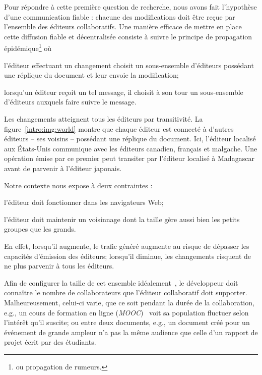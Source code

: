 Pour répondre à cette première question de recherche, nous avons fait
l'hypothèse d'une communication fiable : chacune des modifications doit être
reçue par l'ensemble des éditeurs collaboratifs.
Une manière efficace de mettre en place cette diffusion fiable et décentralisée
consiste à suivre le principe de propagation épidémique\footnote{ou propagation
  de rumeurs.}  où
\begin{inparaenum}[(i)]
\item l'éditeur effectuant un changement choisit un sous-ensemble d'éditeurs
  possédant une réplique du document et leur envoie la modification;
\item lorsqu'un éditeur reçoit un tel message, il choisit à son tour un
  sous-ensemble d'éditeurs auxquels faire suivre le message.
\end{inparaenum}
Les changements atteignent tous les éditeurs par transitivité.
La figure~\ref{intro:img:world} montre que chaque éditeur est connecté à
d'autres éditeurs -- ses voisins -- possédant une réplique du document. Ici,
l'éditeur localisé aux États-Unis communique avec les éditeurs canadien,
français et malgache.
Une opération émise par ce premier peut transiter par l'éditeur localisé à
Madagascar avant de parvenir à l'éditeur japonais. 

Notre contexte nous expose à deux contraintes :
\begin{inparaenum}[(i)]
\item l'éditeur doit fonctionner dans les navigateurs Web;
\item l'éditeur doit maintenir un voisinnage dont la taille gère aussi bien les
  petits groupes que les grands.
\end{inparaenum}
En effet, lorsqu'il augmente, le trafic généré augmente au risque de dépasser
les capacités d'émission des éditeurs; lorsqu'il diminue, les changements
risquent de ne plus parvenir à tous les éditeurs.

Afin de configurer la taille de cet ensemble idéalement~\cite{erdos1959random},
le développeur doit connaître le nombre de collaborateurs que l'éditeur
collaboratif doit supporter. Malheureusement, celui-ci varie, que ce soit
pendant la durée de la collaboration, e.g., un cours de formation en ligne
(\emph{MOOC})~\cite{breslow2013studying} voit sa population fluctuer selon
l'intérêt qu'il suscite; ou entre deux documents, e.g., un document créé pour un
événement de grande ampleur n'a pas la même audience que celle d'un rapport de
projet écrit par des étudiants.

